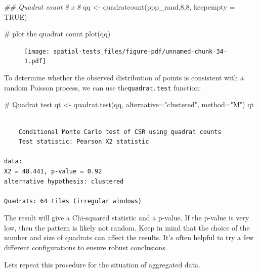 \documentclass[
  letterpaper,
]{book}
\newenvironment{Shaded}{\begin{snugshade}}{\end{snugshade}}
\newcommand{\AttributeTok}[1]{\textcolor[rgb]{0.40,0.45,0.13}{#1}}
\newcommand{\CommentTok}[1]{\textcolor[rgb]{0.37,0.37,0.37}{#1}}
\newcommand{\ConstantTok}[1]{\textcolor[rgb]{0.56,0.35,0.01}{#1}}
\newcommand{\DecValTok}[1]{\textcolor[rgb]{0.68,0.00,0.00}{#1}}
\newcommand{\DocumentationTok}[1]{\textcolor[rgb]{0.37,0.37,0.37}{\textit{#1}}}
\newcommand{\FunctionTok}[1]{\textcolor[rgb]{0.28,0.35,0.67}{#1}}
\newcommand{\NormalTok}[1]{\textcolor[rgb]{0.00,0.23,0.31}{#1}}
\newcommand{\OtherTok}[1]{\textcolor[rgb]{0.00,0.23,0.31}{#1}}
\newcommand{\SpecialCharTok}[1]{\textcolor[rgb]{0.37,0.37,0.37}{#1}}
\newcommand{\StringTok}[1]{\textcolor[rgb]{0.13,0.47,0.30}{#1}}
\begin{document}
\begin{Shaded}
\begin{Highlighting}[]
\DocumentationTok{\#\# Quadrat count 8 x 8}
\NormalTok{qq }\OtherTok{\textless{}{-}} \FunctionTok{quadratcount}\NormalTok{(ppp\_rand,}\DecValTok{8}\NormalTok{,}\DecValTok{8}\NormalTok{, }\AttributeTok{keepempty =} \ConstantTok{TRUE}\NormalTok{) }

\CommentTok{\# plot the quadrat count}
\FunctionTok{plot}\NormalTok{(qq)}
\end{Highlighting}
\end{Shaded}

\begin{figure}[H]

\texttt{[image: spatial-tests\_files/figure-pdf/unnamed-chunk-34-1.pdf]} \hfill{}

\end{figure}

To determine whether the observed distribution of points is consistent
with a random Poisson process, we can use the\texttt{quadrat.test}
function:

\begin{Shaded}
\begin{Highlighting}[]
\CommentTok{\# Quadrat test}
\NormalTok{qt }\OtherTok{\textless{}{-}} \FunctionTok{quadrat.test}\NormalTok{(qq, }\AttributeTok{alternative=}\StringTok{"clustered"}\NormalTok{, }\AttributeTok{method=}\StringTok{"M"}\NormalTok{)}
\NormalTok{qt}
\end{Highlighting}
\end{Shaded}

\begin{verbatim}

    Conditional Monte Carlo test of CSR using quadrat counts
    Test statistic: Pearson X2 statistic

data:  
X2 = 48.441, p-value = 0.92
alternative hypothesis: clustered

Quadrats: 64 tiles (irregular windows)
\end{verbatim}

The result will give a Chi-squared statistic and a p-value. If the
p-value is very low, then the pattern is likely not random. Keep in mind
that the choice of the number and size of quadrats can affect the
results. It's often helpful to try a few different configurations to
ensure robust conclusions.

Lets repeat this procedure for the situation of aggregated data.

\begin{Shaded}
\end{Shaded}
\end{document}
